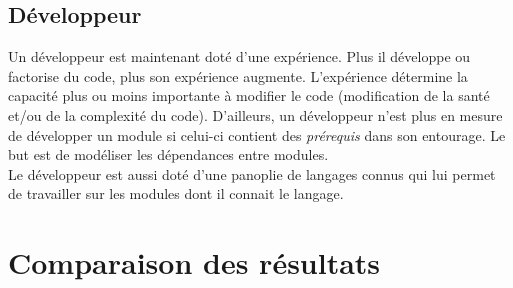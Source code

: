 \documentclass{article}
\begin{document}
\newpage
\subsection{Développeur}
Un développeur est maintenant doté d'une expérience. Plus il développe ou factorise du code, plus son expérience augmente. L'expérience détermine la capacité plus ou moins importante à modifier le code (modification de la santé et/ou de la complexité du code).
D'ailleurs, un développeur n'est plus en mesure de développer un module si celui-ci contient des \textit{prérequis} dans son entourage. Le but est de modéliser les dépendances entre modules.
\\

Le développeur est aussi doté d'une panoplie de langages connus qui lui permet de travailler sur les modules dont il connait le langage.

\section{Comparaison des résultats}
\end{document}
